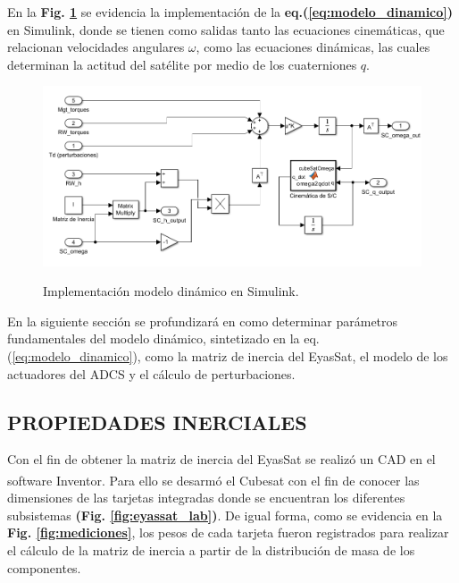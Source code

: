 En la \textbf{Fig. \ref{fig:din_sc}} se evidencia la implementación de la \textbf{eq.(\ref{eq:modelo_dinamico})} en Simulink, donde se tienen como salidas tanto las ecuaciones cinemáticas, que relacionan velocidades angulares $\omega$, como las ecuaciones dinámicas, las cuales determinan la actitud del satélite por medio de los cuaterniones $q$.


\begin{figure}[!h]
	\begin{center}
		\includegraphics[scale=0.6]{imagenes/modelo_dinamico/dinamica_satelite.PNG}\\
	\end{center}
	\caption{Implementación modelo dinámico en Simulink.}
	\label{fig:din_sc}
	\textit{}
\end{figure}

En la siguiente sección se profundizará en como determinar parámetros fundamentales del modelo dinámico, sintetizado en la eq. (\ref{eq:modelo_dinamico}), como la matriz de inercia del EyasSat, el modelo de los actuadores del ADCS y el cálculo de perturbaciones. 

\newpage
\subsection{PROPIEDADES INERCIALES}


Con el fin de obtener la matriz de inercia del EyasSat se realizó un CAD en el software Inventor\textsuperscript{\tiny\textregistered}. Para ello se desarmó el Cubesat con el fin de conocer las dimensiones de las tarjetas integradas donde se encuentran los diferentes subsistemas \textbf{(Fig. \ref{fig:eyassat_lab})}. De igual forma, como se evidencia en la \textbf{Fig. \ref{fig:mediciones}}, los pesos de cada tarjeta fueron registrados para realizar el cálculo de la matriz de inercia a partir de la distribución de masa de los componentes.


